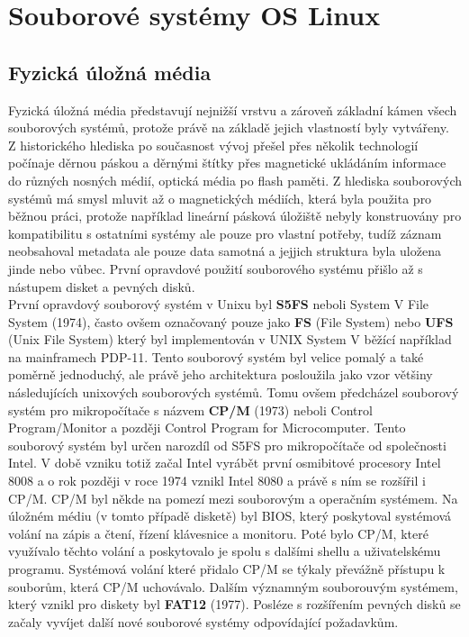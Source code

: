 \chapter{Souborové systémy OS Linux}

\section{Fyzická úložná média}
Fyzická úložná média představují nejnižší vrstvu  a zároveň základní kámen všech souborových systémů, protože právě na základě jejich vlastností byly vytvářeny.\\
Z historického hlediska po současnost vývoj přešel přes několik technologií počínaje děrnou páskou a děrnými štítky přes magnetické ukládáním informace do různých nosných médií, optická média po flash paměti. Z hlediska souborových systémů má smysl mluvit až o magnetických médiích, která byla použita pro běžnou práci, protože například lineární pásková úložiště nebyly konstruovány pro kompatibilitu s ostatními systémy ale pouze pro vlastní potřeby, tudíž záznam neobsahoval metadata ale pouze data samotná a jejjich struktura byla uložena jinde nebo vůbec. První opravdové použití souborového systému přišlo až s nástupem disket a pevných disků. \\
První opravdový souborový systém v Unixu byl \textbf{S5FS} neboli System V File System (1974), často ovšem označovaný pouze jako \textbf{FS} (File System) nebo \textbf{UFS} (Unix File System) který byl implementován v UNIX System V běžící například na mainframech PDP-11. Tento souborový systém byl velice pomalý a také poměrně jednoduchý, ale právě jeho architektura posloužila jako vzor většiny následujících unixových souborových systémů. Tomu ovšem předcházel souborový systém pro mikropočítače s názvem \textbf{CP/M} (1973) neboli Control Program/Monitor a později Control Program for Microcomputer. Tento souborový systém byl určen narozdíl od S5FS pro mikropočítače od společnosti Intel. V době vzniku totiž začal Intel vyrábět první osmibitové procesory Intel 8008 a o rok později v roce 1974 vznikl Intel 8080 a právě s ním se rozšířil i CP/M. CP/M byl někde na pomezí mezi souborovým a operačním systémem. Na úložném médiu (v tomto případě disketě) byl BIOS, který poskytoval systémová volání na zápis a čtení, řízení klávesnice a monitoru. Poté bylo CP/M, které využívalo těchto volání a poskytovalo je spolu s dalšími shellu a uživatelskému programu. Systémová volání které přidalo CP/M se týkaly převážně přístupu k souborům, která CP/M uchovávalo. Dalším významným souborouvým systémem, který vznikl pro diskety byl \textbf{FAT12} (1977). Posléze s rozšířením pevných disků se začaly vyvíjet další nové souborové systémy odpovídající požadavkům.\\
